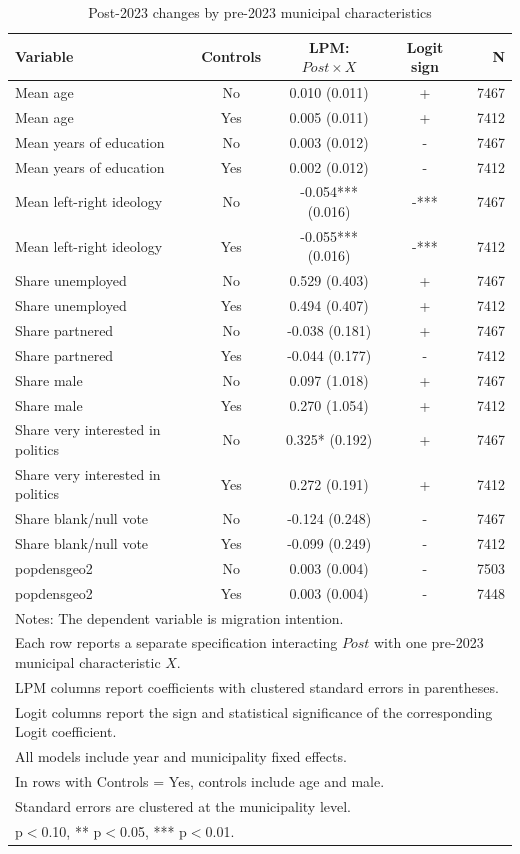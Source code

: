 \begin{table}[!htbp]
\centering
\caption{Post-2023 changes by pre-2023 municipal characteristics}
\label{tab:post_x_combined_key}
\small
\begin{tabular}{lcccr}
\hline
Variable & Controls & LPM: $Post \times X$ & Logit sign & N \\
\hline
Mean age & No & 0.010 (0.011) & + & 7467 \\
Mean age & Yes & 0.005 (0.011) & + & 7412 \\
Mean years of education & No & 0.003 (0.012) & - & 7467 \\
Mean years of education & Yes & 0.002 (0.012) & - & 7412 \\
Mean left-right ideology & No & -0.054*** (0.016) & -*** & 7467 \\
Mean left-right ideology & Yes & -0.055*** (0.016) & -*** & 7412 \\
Share unemployed & No & 0.529 (0.403) & + & 7467 \\
Share unemployed & Yes & 0.494 (0.407) & + & 7412 \\
Share partnered & No & -0.038 (0.181) & + & 7467 \\
Share partnered & Yes & -0.044 (0.177) & - & 7412 \\
Share male & No & 0.097 (1.018) & + & 7467 \\
Share male & Yes & 0.270 (1.054) & + & 7412 \\
Share very interested in politics & No & 0.325* (0.192) & + & 7467 \\
Share very interested in politics & Yes & 0.272 (0.191) & + & 7412 \\
Share blank/null vote & No & -0.124 (0.248) & - & 7467 \\
Share blank/null vote & Yes & -0.099 (0.249) & - & 7412 \\
popdensgeo2 & No & 0.003 (0.004) & - & 7503 \\
popdensgeo2 & Yes & 0.003 (0.004) & - & 7448 \\
\hline
\multicolumn{5}{l}{\footnotesize Notes: The dependent variable is migration intention.} \\
\multicolumn{5}{l}{\footnotesize Each row reports a separate specification interacting $Post$ with one pre-2023 municipal characteristic $X$.} \\
\multicolumn{5}{l}{\footnotesize LPM columns report coefficients with clustered standard errors in parentheses.} \\
\multicolumn{5}{l}{\footnotesize Logit columns report the sign and statistical significance of the corresponding Logit coefficient.} \\
\multicolumn{5}{l}{\footnotesize All models include year and municipality fixed effects.} \\
\multicolumn{5}{l}{\footnotesize In rows with Controls = Yes, controls include age and male.} \\
\multicolumn{5}{l}{\footnotesize Standard errors are clustered at the municipality level.} \\
\multicolumn{5}{l}{\footnotesize * p$<$0.10, ** p$<$0.05, *** p$<$0.01.} \\
\end{tabular}
\end{table}

